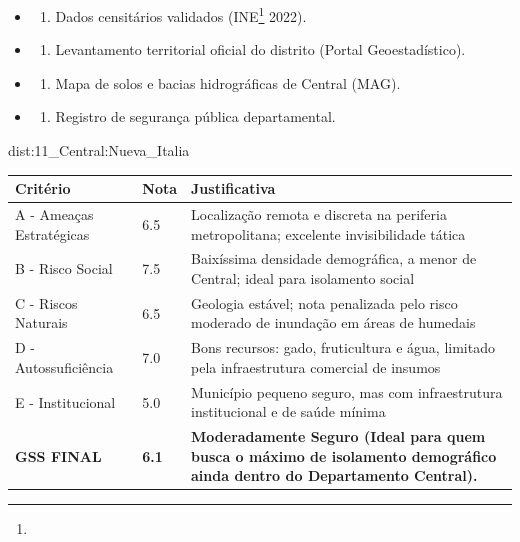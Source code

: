 {\begin{itemize}
\tightlist
\item
  \begin{enumerate}
  \def\labelenumi{\arabic{enumi})}
  \tightlist
  \item
    Dados censitários validados (INE\footnote{\fineINE} 2022).
  \end{enumerate}
\item
  \begin{enumerate}
  \def\labelenumi{\arabic{enumi})}
  \setcounter{enumi}{1}
  \tightlist
  \item
    Levantamento territorial oficial do distrito (Portal
    Geoestadístico).
  \end{enumerate}
\item
  \begin{enumerate}
  \def\labelenumi{\arabic{enumi})}
  \setcounter{enumi}{2}
  \tightlist
  \item
    Mapa de solos e bacias hidrográficas de Central (MAG).
  \end{enumerate}
\item
  \begin{enumerate}
  \def\labelenumi{\arabic{enumi})}
  \setcounter{enumi}{3}
  \tightlist
  \item
    Registro de segurança pública departamental.
  \end{enumerate}
\end{itemize}}{dist:11_Central:Nueva_Italia}
\begin{table}[ht!]
\small \begin{tabular}{p{3.0cm}p{0.8cm}p{6.0cm}} \toprule
\textbf{Critério} & \textbf{Nota} & \textbf{Justificativa} \\ \midrule
A - Ameaças Estratégicas & 6.5 & Localização remota e discreta na periferia metropolitana; excelente invisibilidade tática \\
B - Risco Social & 7.5 & Baixíssima densidade demográfica, a menor de Central; ideal para isolamento social \\
C - Riscos Naturais & 6.5 & Geologia estável; nota penalizada pelo risco moderado de inundação em áreas de humedais \\
D - Autossuficiência & 7.0 & Bons recursos: gado, fruticultura e água, limitado pela infraestrutura comercial de insumos \\
E - Institucional & 5.0 & Município pequeno seguro, mas com infraestrutura institucional e de saúde mínima \\
\midrule \textbf{GSS FINAL} & \textbf{6.1} & \textbf{Moderadamente Seguro (Ideal para quem busca o máximo de isolamento demográfico ainda dentro do Departamento Central).} \\ \bottomrule \end{tabular}
\end{table}
